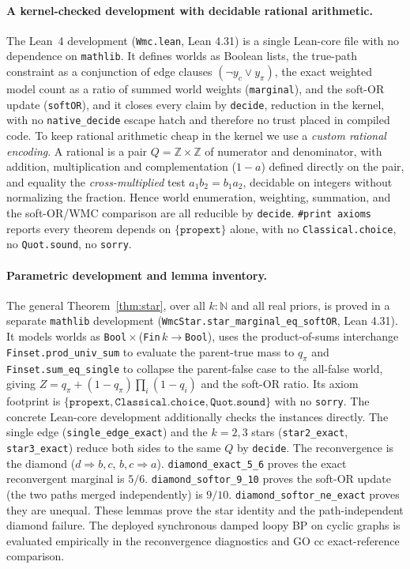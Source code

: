 \documentclass[letterpaper]{article}
\begin{document}
\paragraph{A kernel-checked development with decidable rational arithmetic.}
The Lean~4 development (\texttt{Wmc.lean}, Lean 4.31) is a single Lean-core file with no
dependence on \texttt{mathlib}. It defines worlds as Boolean lists, the true-path constraint
as a conjunction of edge clauses $(\neg y_c \vee y_\pi)$, the exact weighted model count as a
ratio of summed world weights (\texttt{marginal}), and the soft-OR update (\texttt{softOR}),
and it closes every claim by \texttt{decide}, reduction in the kernel, with no
\texttt{native\_decide} escape hatch and therefore no trust placed in compiled code. To keep
rational arithmetic cheap in the kernel we use a \emph{custom rational encoding}. A rational
is a pair $Q=\mathbb{Z}\times\mathbb{Z}$ of numerator and denominator, with addition,
multiplication and complementation ($1-a$) defined directly on the pair, and equality the
\emph{cross-multiplied} test $a_1 b_2 = b_1 a_2$, decidable on integers without normalizing the
fraction. Hence world enumeration, weighting, summation, and the soft-OR/WMC comparison are all
reducible by \texttt{decide}. \texttt{\#print axioms} reports every theorem depends on
$\{\texttt{propext}\}$ alone, with no \texttt{Classical.choice}, no \texttt{Quot.sound}, no
\texttt{sorry}.

\paragraph{Parametric development and lemma inventory.}
The general Theorem~\ref{thm:star}, over all $k:\mathbb{N}$ and all real priors, is proved in a
separate \texttt{mathlib} development (\texttt{WmcStar.star\_marginal\_eq\_softOR}, Lean 4.31).
It models worlds as \texttt{Bool}\,$\times$\,(\texttt{Fin}\,$k\to$\texttt{Bool}), uses the
product-of-sums interchange \texttt{Finset.prod\_univ\_sum} to evaluate the parent-true mass to
$q_\pi$ and \texttt{Finset.sum\_eq\_single} to collapse the parent-false case to the all-false
world, giving $Z=q_\pi+(1-q_\pi)\prod_i(1-q_i)$ and the soft-OR ratio. Its axiom footprint is
$\{\texttt{propext},\texttt{Classical.choice},\texttt{Quot.sound}\}$ with no \texttt{sorry}. The
concrete Lean-core development additionally checks the instances directly. The single edge
(\texttt{single\_edge\_exact}) and the $k{=}2,3$ stars (\texttt{star2\_exact},
\texttt{star3\_exact}) reduce both sides to the same $Q$ by \texttt{decide}. The reconvergence is the diamond
($d\!\Rightarrow\!b,c$, $b,c\!\Rightarrow\!a$). \texttt{diamond\_exact\_5\_6} proves the exact
reconvergent marginal is $5/6$. \texttt{diamond\_softor\_9\_10} proves the soft-OR update (the
two paths merged independently) is $9/10$. \texttt{diamond\_softor\_ne\_exact} proves they
are unequal. These lemmas prove the star identity and the path-independent diamond failure.
The deployed synchronous damped loopy BP on cyclic graphs is evaluated
empirically in the reconvergence diagnostics and GO cc exact-reference
comparison.
\end{document}
